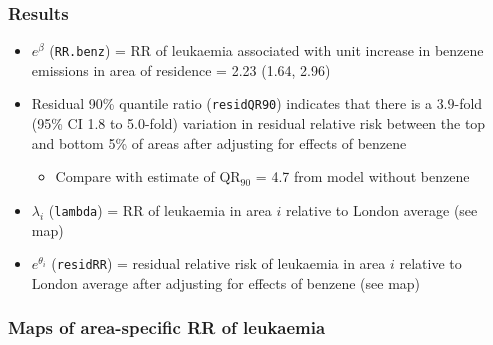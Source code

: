 \documentclass{beamer}
\newcommand{\I}{\item}
\newcommand{\bibig}{\begin{itemize}}
\newcommand{\eibig}{\end{itemize}}
\begin{document}
\begin{frame}
\frametitle{Results}
\bibig \I $e^{\beta}$ ({\tt RR.benz}) = RR of leukaemia associated with
unit increase in benzene emissions in area of
residence = 2.23 (1.64, 2.96)\vspace{2mm}
\I Residual 90\% quantile ratio ({\tt residQR90}) indicates that
there is a $3.9$-fold (95\% CI 1.8 to 5.0-fold) variation
  in residual relative risk between the top and bottom 5\% of areas
  \alert{after adjusting for effects of benzene}\vspace{1mm}
  \bibig
  \I Compare with estimate of QR$_{90}$ = 4.7 from model without benzene\vspace{2mm}
  \eibig
\I $\lambda_i$ ({\tt lambda}) = RR of leukaemia in area $i$ relative
to London average (see map)\vspace{2mm}
\I $e^{\theta_i}$ ({\tt residRR}) = residual relative risk of
leukaemia in area $i$ relative to London average \alert{after adjusting for effects of benzene} (see map)
  \eibig
\end{frame}

\begin{frame}
\frametitle{Maps of area-specific RR of leukaemia}
\centerline{}
\end{frame}

\end{document}
